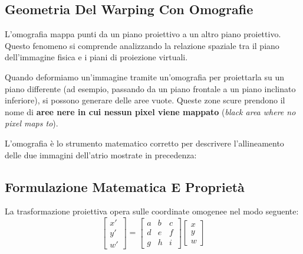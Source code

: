 ﻿\documentclass[11pt, a4paper]{article}
\begin{document}

\subsection{Geometria Del Warping Con Omografie}

L'omografia mappa punti da un piano proiettivo a un altro piano proiettivo. Questo fenomeno si comprende analizzando la relazione spaziale tra il piano dell'immagine fisica e i piani di proiezione virtuali.


Quando deformiamo un'immagine tramite un'omografia per proiettarla su un piano differente (ad esempio, passando da un piano frontale a un piano inclinato inferiore), si possono generare delle aree vuote. Queste zone scure prendono il nome di \textbf{aree nere in cui nessun pixel viene mappato} (\emph{black area where no pixel maps to}).

L'omografia è lo strumento matematico corretto per descrivere l'allineamento delle due immagini dell'atrio mostrate in precedenza:


\subsection{Formulazione Matematica E Proprietà}

La trasformazione proiettiva opera sulle coordinate omogenee nel modo seguente:
\[
\begin{bmatrix} x' \\ y' \\ w' \end{bmatrix} = \begin{bmatrix} a & b & c \\ d & e & f \\ g & h & i \end{bmatrix} \begin{bmatrix} x \\ y \\ w \end{bmatrix}
\]
\end{document}
